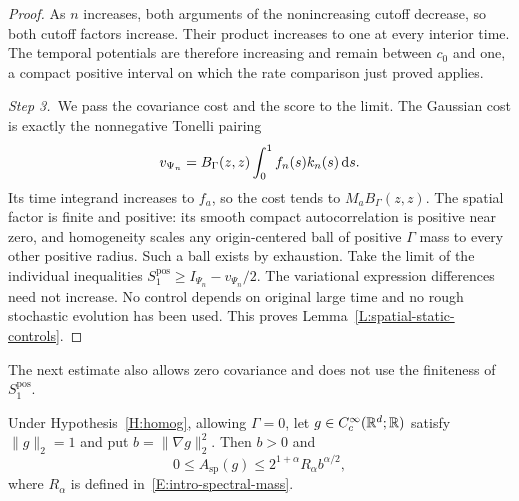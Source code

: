 \begin{proof}
  As $n$ increases, both arguments of the nonincreasing cutoff decrease, so
  both cutoff factors increase. Their product increases to one at every
  interior time. The temporal potentials are therefore increasing and remain
  between $c_0$ and one, a compact positive interval on which the rate
  comparison just proved applies.

  \medskip
  \noindent\textit{Step 3.~}We pass the covariance cost and the score to the
  limit.
  The Gaussian cost is exactly the nonnegative Tonelli pairing
  \[
    v_{\Psi_n}=B_\Gamma(z,z)\int_0^1f_n(s)k_n(s)\,\mathrm{d} s.
  \]
  Its time integrand increases to $f_a$, so the cost tends to
  $M_aB_\Gamma(z,z)$. The spatial factor is finite and positive: its smooth
  compact autocorrelation is positive near zero, and homogeneity scales any
  origin-centered ball of positive $\Gamma$ mass to every other positive radius.
  Such a ball exists by exhaustion. Take the limit of the individual
  inequalities $S_1^{\mathrm{pos}} \ge I_{\Psi_n}-v_{\Psi_n}/2$. The variational
  expression differences need not increase. No control depends on original large
  time and no rough stochastic evolution has been used. This proves
  Lemma~\ref{L:spatial-static-controls}.
\end{proof}

The next estimate also allows zero covariance and does not use the finiteness
of $S_1^{\mathrm{pos}}$.

\begin{lemma}
  \label{L:spatial-fourier-bound}
  Under Hypothesis~\ref{H:homog}, allowing $\Gamma=0$, let
  $g\in C_c^\infty(\mathbb{R}^d;\mathbb{R})$ satisfy $\|g\|_2=1$ and put
  $b=\|\nabla g\|_2^2$. Then $b>0$ and
  \begin{equation}\label{E:spatial-fourier-bound}
    0\le A_{\mathrm{sp}}(g)
    \le 2^{1+\alpha}R_\alpha b^{\alpha/2},
  \end{equation}
  where $R_\alpha$ is defined in~\eqref{E:intro-spectral-mass}.
\end{lemma}

